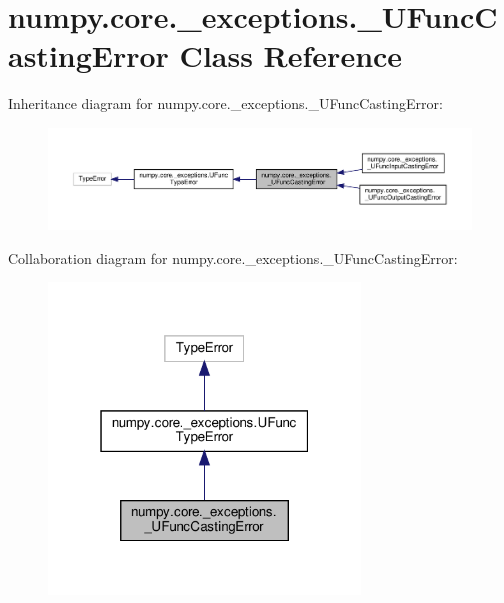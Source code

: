 \hypertarget{classnumpy_1_1core_1_1__exceptions_1_1__UFuncCastingError}{}\section{numpy.\+core.\+\_\+exceptions.\+\_\+\+U\+Func\+Casting\+Error Class Reference}
\label{classnumpy_1_1core_1_1__exceptions_1_1__UFuncCastingError}


Inheritance diagram for numpy.\+core.\+\_\+exceptions.\+\_\+\+U\+Func\+Casting\+Error\+:
\nopagebreak
\begin{figure}[H]
\begin{center}
\leavevmode
\includegraphics[width=350pt]{classnumpy_1_1core_1_1__exceptions_1_1__UFuncCastingError__inherit__graph}
\end{center}
\end{figure}


Collaboration diagram for numpy.\+core.\+\_\+exceptions.\+\_\+\+U\+Func\+Casting\+Error\+:
\nopagebreak
\begin{figure}[H]
\begin{center}
\leavevmode
\includegraphics[width=235pt]{classnumpy_1_1core_1_1__exceptions_1_1__UFuncCastingError__coll__graph}
\end{center}
\end{figure}
